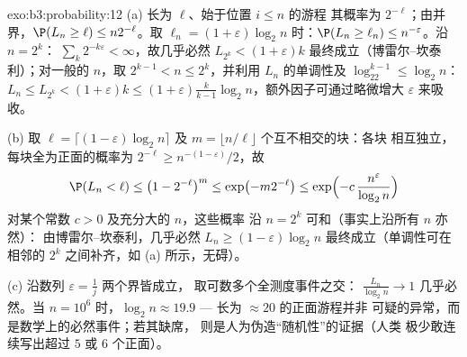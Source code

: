 \begin{solution}{exo:b3:probability:12}
(a) 长为 $\ell$、始于位置 $i \leq n$ 的游程
其概率为 $2^{-\ell}$；由并界，$\P(L_n \geq \ell)
\leq n2^{-\ell}$。取 $\ell_n = (1 +
\varepsilon)\log_2n$ 时：$\P(L_n \geq \ell_n) \leq
n^{-\varepsilon}$。沿 $n = 2^k$：
$\sum_k2^{-k\varepsilon} < \infty$，故几乎必然 $L_{2^k} <
(1+\varepsilon)k$ 最终成立（博雷尔--坎泰利）；对一般的
$n$，取 $2^{k-1} < n \leq 2^k$，并利用
$L_n$ 的单调性及 $\log_22^{k-1} \leq \log_2n$：$L_n \leq L_{2^k}
< (1 + \varepsilon)k \leq (1 + \varepsilon)\frac{k}{k-1}
\log_2n$，额外因子可通过略微增大
$\varepsilon$ 来吸收。

(b) 取 $\ell = \lceil(1 - \varepsilon)\log_2n\rceil$ 及
$m = \lfloor n/\ell\rfloor$ 个互不相交的块：各块
相互独立，每块全为正面的概率为 $2^{-\ell}
\geq n^{-(1-\varepsilon)}/2$，故
\[
\P(L_n < \ell) \leq \bigl(1 - 2^{-\ell}\bigr)^{m}
\leq \exp\bigl(-m2^{-\ell}\bigr)
\leq \exp\Bigl(-c\,\frac{n^{\varepsilon}}{\log_2n}\Bigr)
\]
对某个常数 $c > 0$ 及充分大的 $n$，这些概率
沿 $n = 2^k$ 可和（事实上沿所有 $n$ 亦然）：
由博雷尔--坎泰利，几乎必然 $L_n \geq (1 -
\varepsilon)\log_2n$ 最终成立（单调性可在
相邻的 $2^k$ 之间补齐，如 (a) 所示，无碍）。

(c) 沿数列 $\varepsilon = \frac1j$ 两个界皆成立，
取可数多个全测度事件之交：
$\frac{L_n}{\log_2n} \to 1$ 几乎必然。当 $n = 10^6$ 时，$\log_2n
\approx 19.9$ --- 长为 $\approx 20$ 的正面游程并非
可疑的异常，而是数学上的必然事件；若其缺席，
则是人为伪造“随机性”的证据（人类
极少敢连续写出超过 $5$ 或 $6$ 个正面）。
\end{solution}

